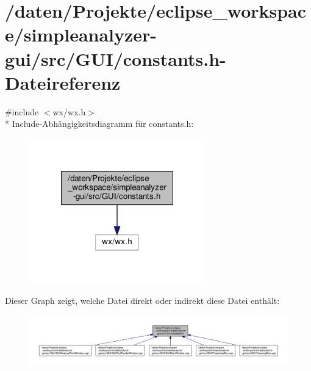 \hypertarget{simpleanalyzer-gui_2src_2GUI_2constants_8h}{\section{/daten/\-Projekte/eclipse\-\_\-workspace/simpleanalyzer-\/gui/src/\-G\-U\-I/constants.h-\/\-Dateireferenz}
\label{simpleanalyzer-gui_2src_2GUI_2constants_8h}
}
{\ttfamily \#include $<$wx/wx.\-h$>$}\\*
Include-\/\-Abhängigkeitsdiagramm für constants.\-h\-:
\nopagebreak
\begin{figure}[H]
\begin{center}
\leavevmode
\includegraphics[width=216pt]{simpleanalyzer-gui_2src_2GUI_2constants_8h__incl}
\end{center}
\end{figure}
Dieser Graph zeigt, welche Datei direkt oder indirekt diese Datei enthält\-:
\nopagebreak
\begin{figure}[H]
\begin{center}
\leavevmode
\includegraphics[width=350pt]{simpleanalyzer-gui_2src_2GUI_2constants_8h__dep__incl}
\end{center}
\end{figure}

